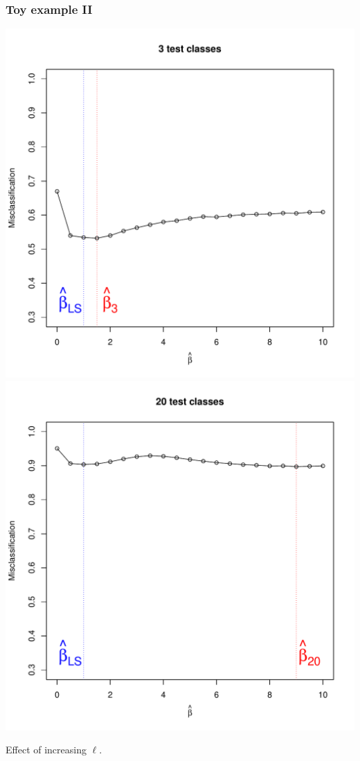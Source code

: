 \documentclass{beamer}
\begin{document}
\begin{frame}
\frametitle{Toy example II}
\begin{center}
\includegraphics[scale = 0.3]{toy2_l3.pdf}
\includegraphics[scale = 0.3]{toy2_l20.pdf}
\end{center}
Effect of increasing $\ell$.
\end{frame}
\end{document}
